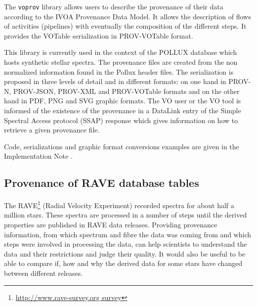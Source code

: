 The \texttt{voprov} library allows users to describe the provenance of their data
according to the IVOA Provenance Data Model. It allows the description of flows
of activities (pipelines) with eventually the composition of the different
steps. It provides the VOTable serialization in PROV-VOTable format.

This library is currently used in the context of the POLLUX database which hosts
synthetic stellar spectra. The provenance files are created from the non
normalized information found in the Pollux header files. The serialization is
proposed in three levels of detail and in different formats: on one hand in PROV-N,
PROV-JSON, PROV-XML and PROV-VOTable formats and on the other hand in PDF, PNG and SVG graphic
formats. The VO user or the VO tool is informed of the existence of the
provenance in a DataLink entry of the Simple Spectral Access protocol (SSAP) response which gives information on
how to retrieve a given provenance file.

Code, serializations and graphic format conversions examples are given in the Implementation Note \citep{std:ProvenanceImplementationNote}.

%
%

\subsection{Provenance of RAVE database tables}
The RAVE\footnote{\url{http://www.rave-survey.org survey}} (Radial Velocity Experiment) recorded spectra for about half a 
million stars. These spectra are processed in a number of steps until the 
derived properties are published in RAVE data releases.
Providing provenance information, from which spectrum and fibre the
data was coming from and which steps were involved in processing the data, can help scientists
to understand the data and their restrictions and judge their quality.
It would also be useful to be able to compare if, how and why the derived data for some stars have changed between different releases.

